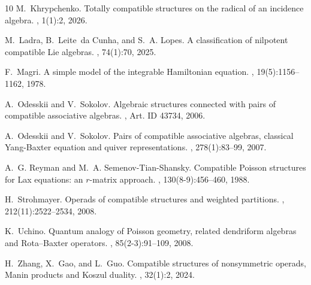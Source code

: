 \documentclass{jonasart}
\begin{document}
{\begin{thebibliography}{10}
            M.~Khrypchenko.
            \newblock Totally compatible structures on the radical of an incidence algebra.
            , 1(1):2, 2026.
            
            M.~Ladra, B.~Leite~da Cunha, and S.~A. Lopes.
            \newblock A classification of nilpotent compatible {L}ie algebras.
            , 74(1):70, 2025.
            
            F.~Magri.
            \newblock A simple model of the integrable {H}amiltonian equation.
            , 19(5):1156–1162, 1978.
            
            A.~Odesskii and V.~{S}okolov.
            \newblock Algebraic structures connected with pairs of compatible associative algebras.
            , Art. ID 43734, 2006.
            
            A.~Odesskii and V.~{S}okolov.
            \newblock Pairs of compatible associative algebras, classical {Y}ang-{B}axter equation and quiver representations.
            , 278(1):83–99, 2007.
            
            A.~G. Reyman and M.~A. Semenov-Tian-Shansky.
            \newblock Compatible {P}oisson structures for {L}ax equations: an {$r$}-matrix approach.
            , 130(8-9):456--460, 1988.
            
            H.~Strohmayer.
            \newblock Operads of compatible structures and weighted partitions.
            , 212(11):2522–2534, 2008.
            
            K.~Uchino.
            \newblock Quantum analogy of {P}oisson geometry, related dendriform algebras and {R}ota–Baxter operators.
            , 85(2-3):91–109, 2008.
            
            H.~Zhang, X.~{G}ao, and L.~{G}uo.
            \newblock Compatible structures of nonsymmetric operads, {M}anin products and {K}oszul duality.
            , 32(1):2, 2024.
            

\end{thebibliography}}
\end{document}
